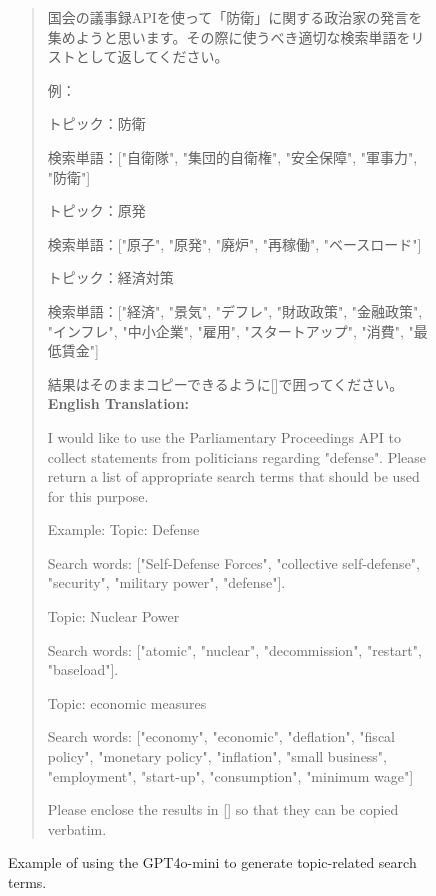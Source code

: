 \documentclass[final,5p,times,twocolumn,authoryear]{elsarticle}
\begin{document}
\begin{figure}[htbp]
    \centering
    \begin{quote}
    \begin{CJK}{UTF8}{min}
        国会の議事録APIを使って「防衛」に関する政治家の発言を集めようと思います。その際に使うべき適切な検索単語をリストとして返してください。
    
        例：
        
        トピック：防衛
        
        検索単語：["自衛隊", "集団的自衛権", "安全保障", "軍事力", "防衛"]
        
        トピック：原発
        
        検索単語：["原子", "原発", "廃炉", "再稼働", "ベースロード"]
        
        トピック：経済対策
        
        検索単語：["経済", "景気", "デフレ", "財政政策", "金融政策", "インフレ", "中小企業", "雇用", "スタートアップ", "消費", "最低賃金"]
        
        結果はそのままコピーできるように[]で囲ってください。\newline
        \textbf{English Translation: }
        
        I would like to use the Parliamentary Proceedings API to collect statements from politicians regarding "defense". Please return a list of appropriate search terms that should be used for this purpose.
    
        Example:
        \newline
        Topic: Defense
        
        Search words: ["Self-Defense Forces", "collective self-defense", "security", "military power", "defense"].
        
        Topic: Nuclear Power
        
        Search words: ["atomic", "nuclear", "decommission", "restart", "baseload"].
        
        Topic: economic measures
        
        Search words: ["economy", "economic", "deflation", "fiscal policy", "monetary policy", "inflation", "small business", "employment", "start-up", "consumption", "minimum wage"]
        
        Please enclose the results in [] so that they can be copied verbatim.
        \end{CJK}
    \end{quote}
    \caption{Example of using the GPT4o-mini to generate topic-related search terms.}
    \label{fig:parliamentary_api_example}
\end{figure}
\end{document}
